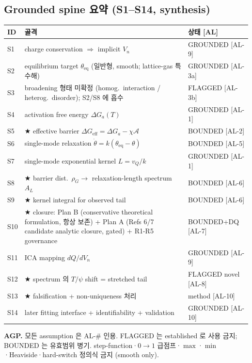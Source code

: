 \documentclass[11pt,a4paper]{article}
\newcommand{\eff}{\mathrm{eff}}
\newcommand{\eq}{\mathrm{eq}}
\newcommand{\AL}[1]{\textsf{[AL-#1]}}
\begin{document}
\subsection{Grounded spine 요약 (S1--S14, synthesis)}\label{sec:spine}
\begin{longtable}{p{} p{} p{}}
\toprule ID & 골격 & 상태 [AL] \\ \midrule \endhead
S1 & charge conservation $\Rightarrow$ implicit $V_n$ & GROUNDED \AL{9} \\
S2 & equilibrium target $\theta_\eq$ (일반형, smooth; lattice-gas 특수해) & GROUNDED \AL{3a} \\
S3 & broadening 형태 미확정 (homog.\ interaction / heterog.\ disorder); S2/S8 에 흡수 & FLAGGED \AL{3b} \\
S4 & activation free energy $\Delta G_a(T)$ & GROUNDED \AL{1} \\
S5 & ★ effective barrier $\Delta G_\eff=\Delta G_a-\chi\mathcal A$ & BOUNDED \AL{2} \\
S6 & single-mode relaxation $\dot\theta=k(\theta_\eq-\theta)$ & BOUNDED \AL{5} \\
S7 & single-mode exponential kernel $L=v_Q/k$ & GROUNDED \AL{1} \\
S8 & ★ barrier dist.\ $\rho_G\to$ relaxation-length spectrum $A_L$ & BOUNDED \AL{6} \\
S9 & ★ kernel integral for observed tail & BOUNDED \AL{6} \\
S10 & ★ closure: Plan B (conservative theoretical formulation, 항상 보존) + Plan A (Refs 6/7 candidate analytic closure, gated) + R1-R5 governance & BOUNDED+DQ \AL{7} \\
S11 & ICA mapping $dQ/dV_n$ & GROUNDED \AL{9} \\
S12 & ★ spectrum 의 $T/\psi$ shift = stretched tail & FLAGGED novel \AL{8} \\
S13 & ★ falsification + non-uniqueness 처리 & method \AL{10} \\
S14 & later fitting interface + identifiability + validation & GROUNDED \AL{10} \\
\bottomrule
\end{longtable}
\textbf{AGP.} 모든 assumption 은 AL-\# 인용. FLAGGED 는 established 로 사용 금지; BOUNDED
는 유효범위 병기. step-function·$0\!\to\!1$ 급점프·$\max$·$\min$·Heaviside·hard-switch
정의식 금지 (smooth only).

\end{document}

